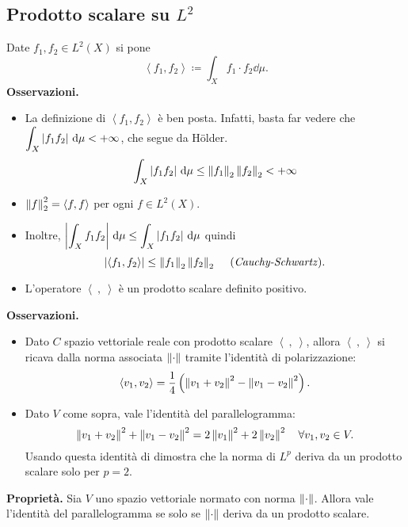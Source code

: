 \documentclass[a4paper, 12pt]{report}
\begin{document}
\subsection{Prodotto scalare su $L^2$}

Date $f_1,f_2 \in L^2(X)$ si pone
%
$$
\left<f_1, f_2 \right> \coloneqq \int_{X}^{} f_1 \cdot f_2 \dd \mu.
$$
%
\textbf{Osservazioni.}

\begin{itemize}
\item La definizione di $\left<f_1, f_2 \right>$ è ben posta.
Infatti, basta far vedere che $\displaystyle \int_X \left| f_1 f_2 \right| \,\mathrm{d} \mu < +\infty$, che segue da H\"{o}lder.
%
$$
\int_{X}^{} \left| f_1 f_2 \right| \,\mathrm{d} \mu \leq \left\lVert f_1 \right\rVert_2 \left\lVert f_2 \right\rVert_2 < +\infty
$$
%

\item $\left\lVert f \right\rVert_2^2 = \left<f,f \right>$ per ogni $f \in L^2(X)$.

\item Inoltre, $\displaystyle \left| \int_X f_1 f_2 \right| \,\mathrm{d} \mu \leq \int_X \left| f_1 f_2 \right| \,\mathrm{d} \mu$ quindi
%
$$
\left| \left<f_1, f_2 \right> \right| \leq \left\lVert f_1 \right\rVert_2 \left\lVert f_2 \right\rVert_2 \quad \; \text{(\textit{Cauchy-Schwartz})}.
$$
%

\item L'operatore $\left< \ , \ \right>$ è un prodotto scalare definito positivo.

\end{itemize}

\textbf{Osservazioni.}
\begin{itemize}
\item Dato $C$ spazio vettoriale reale con prodotto scalare $\left<\ ,\ \right>$, allora $\left<\ ,\ \right>$ si ricava dalla norma associata $\left\lVert \cdot \right\rVert$ tramite l'identità di polarizzazione:
%
$$
\left<v_1, v_2 \right> = \frac{1}{4} \left( \left\lVert v_1 + v_2 \right\rVert^2 - \left\lVert v_1 - v_2 \right\rVert^2 \right).
$$
%

\item  Dato $V$ come sopra, vale l'identità del parallelogramma:
%
$$
\left\lVert v_1 + v_2 \right\rVert^2 + \left\lVert v_1 - v_2 \right\rVert^2 = 2 \left\lVert v_1 \right\rVert^2 + 2 \left\lVert v_2 \right\rVert^2 \quad \forall v_1,v_2 \in V.
$$
%
 Usando questa identità di dimostra che la norma di $L^p$ deriva da un prodotto scalare solo per $p=2$.

\end{itemize}

\textbf{Proprietà.}
Sia $V$ uno spazio vettoriale normato con norma $\left\lVert \cdot \right\rVert$. Allora vale l'identità del parallelogramma se solo se $\left\lVert \cdot \right\rVert$ deriva da un prodotto scalare.
\end{document}
